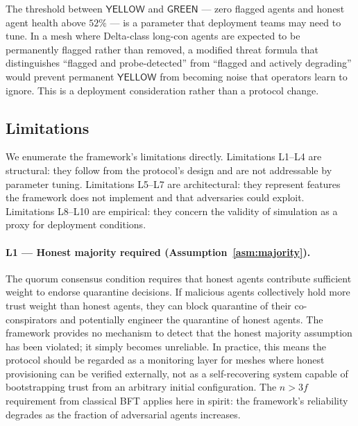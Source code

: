 The threshold between $\mathsf{YELLOW}$ and $\mathsf{GREEN}$ — zero flagged agents
and honest agent health above $52\%$ — is a parameter that deployment teams may need to
tune.  In a mesh where Delta-class long-con agents are expected to be permanently
flagged rather than removed, a modified threat formula that distinguishes ``flagged
and probe-detected'' from ``flagged and actively degrading'' would prevent permanent
$\mathsf{YELLOW}$ from becoming noise that operators learn to ignore.  This is a
deployment consideration rather than a protocol change.

\subsection{Limitations}
\label{sec:limitations}

We enumerate the framework's limitations directly.  Limitations L1--L4 are structural:
they follow from the protocol's design and are not addressable by parameter tuning.
Limitations L5--L7 are architectural: they represent features the framework does not
implement and that adversaries could exploit.  Limitations L8--L10 are empirical:
they concern the validity of simulation as a proxy for deployment conditions.

\paragraph{L1 — Honest majority required (Assumption~\ref{asm:majority}).}
The quorum consensus condition requires that honest agents contribute sufficient weight
to endorse quarantine decisions.  If malicious agents collectively hold more trust weight
than honest agents, they can block quarantine of their co-conspirators and potentially
engineer the quarantine of honest agents.  The framework provides no mechanism to detect
that the honest majority assumption has been violated; it simply becomes unreliable.
In practice, this means the protocol should be regarded as a monitoring layer for meshes
where honest provisioning can be verified externally, not as a self-recovering system
capable of bootstrapping trust from an arbitrary initial configuration.  The $n > 3f$
requirement from classical BFT applies here in spirit: the framework's reliability
degrades as the fraction of adversarial agents increases.

